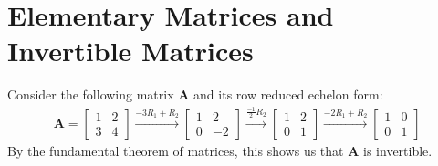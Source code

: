 \documentclass[11pt]{article}
\newcommand{\mat}[1]{\mathbf{#1}}
\begin{document}
\section*{Elementary Matrices and Invertible Matrices}
Consider the following matrix $\mat{A}$ and its row reduced echelon form:
\begin{align*}
\mat{A} = \begin{bmatrix}1 & 2 \\ 3 & 4\end{bmatrix}
\xrightarrow[]{-3 R_1 + R_2}
\begin{bmatrix}1 & 2 \\ 0 & -2\end{bmatrix}
\xrightarrow[]{\frac{-1}{2} R_2}
\begin{bmatrix}1 & 2 \\ 0 & 1\end{bmatrix}
\xrightarrow[]{-2 R_1 + R_2}
\begin{bmatrix}1 & 0 \\ 0 & 1\end{bmatrix}
\end{align*}
By the fundamental theorem of matrices, this shows us that $\mat{A}$ is invertible.
\end{document}
